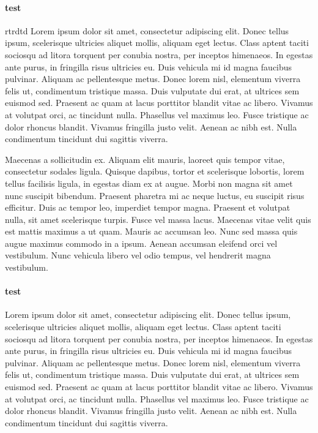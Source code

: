 \documentclass{article}
\begin{document}
\noindent\makeatletter\meaning\paragraph{test}rtrdtd\makeatother
 Lorem ipsum dolor sit amet, consectetur adipiscing elit. Donec tellus ipsum, scelerisque ultricies aliquet mollis, aliquam eget lectus. Class aptent taciti sociosqu ad litora torquent per conubia nostra, per inceptos himenaeos. In egestas ante purus, in fringilla risus ultricies eu. Duis vehicula mi id magna faucibus pulvinar. Aliquam ac pellentesque metus. Donec lorem nisl, elementum viverra felis ut, condimentum tristique massa. Duis vulputate dui erat, at ultrices sem euismod sed. Praesent ac quam at lacus porttitor blandit vitae ac libero. Vivamus at volutpat orci, ac tincidunt nulla. Phasellus vel maximus leo. Fusce tristique ac dolor rhoncus blandit. Vivamus fringilla justo velit. Aenean ac nibh est. Nulla condimentum tincidunt dui sagittis viverra.

Maecenas a sollicitudin ex. Aliquam elit mauris, laoreet quis tempor vitae, consectetur sodales ligula. Quisque dapibus, tortor et scelerisque lobortis, lorem tellus facilisis ligula, in egestas diam ex at augue. Morbi non magna sit amet nunc suscipit bibendum. Praesent pharetra mi ac neque luctus, eu suscipit risus efficitur. Duis ac tempor leo, imperdiet tempor magna. Praesent et volutpat nulla, sit amet scelerisque turpis. Fusce vel massa lacus. Maecenas vitae velit quis est mattis maximus a ut quam. Mauris ac accumsan leo. Nunc sed massa quis augue maximus commodo in a ipsum. Aenean accumsan eleifend orci vel vestibulum. Nunc vehicula libero vel odio tempus, vel hendrerit magna vestibulum. 

\paragraph{test} Lorem ipsum dolor sit amet, consectetur adipiscing elit. Donec tellus ipsum, scelerisque ultricies aliquet mollis, aliquam eget lectus. Class aptent taciti sociosqu ad litora torquent per conubia nostra, per inceptos himenaeos. In egestas ante purus, in fringilla risus ultricies eu. Duis vehicula mi id magna faucibus pulvinar. Aliquam ac pellentesque metus. Donec lorem nisl, elementum viverra felis ut, condimentum tristique massa. Duis vulputate dui erat, at ultrices sem euismod sed. Praesent ac quam at lacus porttitor blandit vitae ac libero. Vivamus at volutpat orci, ac tincidunt nulla. Phasellus vel maximus leo. Fusce tristique ac dolor rhoncus blandit. Vivamus fringilla justo velit. Aenean ac nibh est. Nulla condimentum tincidunt dui sagittis viverra.
\end{document}
